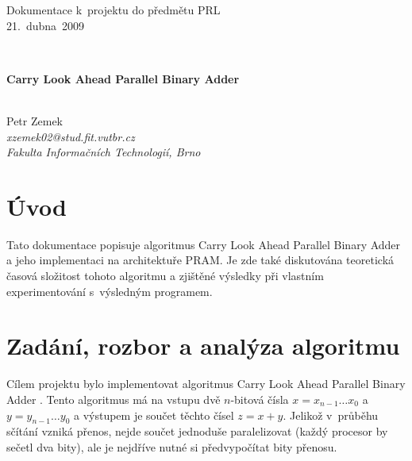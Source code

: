 \documentclass[11pt,a4paper]{article}
\begin{document}
\noindent
\begin{small}Dokumentace k~projektu do předmětu PRL \\ 21.~dubna~2009\end{small} \\

\begin{center}
	\begin{large}\textbf{Carry Look Ahead Parallel Binary Adder}\end{large} \\
	\vspace{0.4cm}
	Petr Zemek \\
	\textit{xzemek02@stud.fit.vutbr.cz} \\
	\textit{Fakulta Informačních Technologií, Brno} \\
\end{center}

\section{Úvod}

Tato dokumentace popisuje algoritmus Carry Look Ahead Parallel Binary Adder \cite{1}
a jeho implementaci na architektuře PRAM. Je zde také diskutována teoretická
časová složitost tohoto algoritmu a zjištěné výsledky při vlastním experimentování
s~výsledným programem.

\section{Zadání, rozbor a analýza algoritmu}

Cílem projektu bylo implementovat algoritmus Carry Look Ahead Parallel Binary Adder \cite{1}.
Tento algoritmus má na vstupu dvě $n$-bitová čísla $x = x_{n-1}\dots x_{0}$
a $y = y_{n-1}\dots y_{0}$ a výstupem je součet těchto čísel $z = x + y$.
Jelikož v~průběhu sčítání vzniká přenos, nejde součet jednoduše
paralelizovat (každý procesor by sečetl dva bity), ale je nejdříve nutné
si předvypočítat bity přenosu. \\
\end{document}
